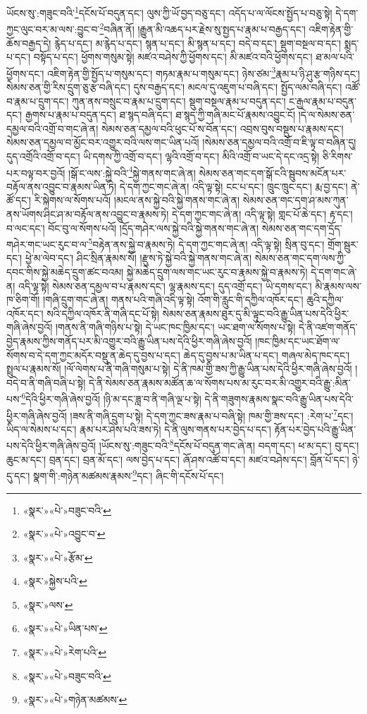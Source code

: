 ཡོངས་སུ་:གཟུང་བའི་\footnote{«སྣར་»«པེ་»བཟུང་བའི་}དངོས་པོ་བདུན་དང་། ལུས་ཀྱི་ཡོ་བྱད་བཅུ་དང་། འདོད་པ་ལ་ལོངས་སྤྱོད་པ་བཅུ་སྟེ། དེ་དག་ཀྱང་ལུང་བར་མ་ལས་:བྱུང་བ་\footnote{«སྣར་»«པེ་»འབྱུང་བ་}བཞིན་ནོ། །རྒྱུན་མི་འཆད་པར་རྗེས་སུ་སྤྱད་པ་རྣམ་པ་བརྒྱད་དང་། འཇིག་རྟེན་གྱི་ཆོས་བརྒྱད་དེ། རྙེད་པ་དང་། མ་རྙེད་པ་དང་། སྙན་པ་དང་། མི་སྙན་པ་དང་། བདེ་བ་དང་། སྡུག་བསྔལ་བ་དང་། སྨད་པ་དང་། བསྟོད་པ་དང་། ཕྱོགས་གསུམ་སྟེ། མཛའ་བཤེས་ཀྱི་ཕྱོགས་དང་། མི་མཛའ་བའི་ཕྱོགས་དང་། ཐ་མལ་པའི་ཕྱོགས་དང་། འཇིག་རྟེན་གྱི་སྤྱོད་པ་གསུམ་དང་། གཏམ་རྣམ་པ་གསུམ་དང་། ཉེས་ཙམ་\footnote{«སྣར་»«པེ་»རྩོམ་}རྣམ་པ་ཉི་ཤུ་རྩ་གཉིས་དང་། སེམས་ཅན་གྱི་རིས་དྲུག་ཅུ་རྩ་བཞི་དང་། དུས་བརྒྱད་དང་། མངལ་དུ་འཇུག་པ་བཞི་དང་། སྤྱོད་ལམ་བཞི་དང་། འཚོ་བ་རྣམ་པ་དྲུག་དང་། ཀུན་ནས་བསྲུང་བ་རྣམ་པ་དྲུག་དང་། སྡུག་བསྔལ་རྣམ་པ་བདུན་དང་། ང་རྒྱལ་རྣམ་པ་བདུན་དང་། རྒྱགས་པ་རྣམ་པ་བདུན་དང་། ཐ་སྙད་བཞི་དང་། ཐ་སྙད་ཀྱི་གཞི་མང་པོ་རྣམས་འབྱུང་ངོ། །དེ་ལ་སེམས་ཅན་དམྱལ་བའི་འགྲོ་བ་གང་ཞེ་ན། སེམས་ཅན་དམྱལ་བའི་ཕུང་པོ་ས་བོན་དང་། འབྲས་བུས་བསྡུས་པ་རྣམས་དང་། སེམས་ཅན་དམྱལ་བ་མྱོང་བར་འགྱུར་བའི་ལས་གང་ཡིན་པའོ། །སེམས་ཅན་དམྱལ་བའི་འགྲོ་བ་ཇི་ལྟ་བ་བཞིན་དུ། དུད་འགྲོའི་འགྲོ་བ་དང་། ཡི་དགས་ཀྱི་འགྲོ་བ་དང་། ལྷའི་འགྲོ་བ་དང་། མིའི་འགྲོ་བ་ཡང་དེ་དང་འདྲ་སྟེ། ཅི་རིགས་པར་བལྟ་བར་བྱའོ། །སྒོ་ང་ལས་:སྐྱེ་བའི་\footnote{«སྣར་»སྐྱེས་པའི་}སྐྱེ་གནས་གང་ཞེ་ན། སེམས་ཅན་གང་དག་སྒོ་ངའི་སྦུབས་མངོན་པར་བརྟོལ་ནས་འབྱུང་བ་རྣམས་ཡིན་ཏེ། དེ་དག་ཀྱང་གང་ཞེ་ན། འདི་ལྟ་སྟེ། ངང་པ་དང་། ཁྲུང་ཁྲུང་དང་། རྨ་བྱ་དང་། ནེ་ཚོ་དང་། རི་སྐེགས་ལ་སོགས་པའོ། །མངལ་ནས་སྐྱེ་བའི་སྐྱེ་གནས་གང་ཞེ་ན། སེམས་ཅན་གང་དག་ཤ་མས་ཀུན་ནས་ཡོགས་ཤིང་ཤ་མ་བརྟོལ་ནས་འབྱུང་བ་རྣམས་ཏེ། དེ་དག་ཀྱང་གང་ཞེ་ན། འདི་ལྟ་སྟེ། གླང་པོ་ཆེ་དང་། རྟ་དང་། བ་ལང་དང་། བོང་བུ་ལ་སོགས་པའོ། །དྲོད་གཤེར་ལས་སྐྱེ་བའི་སྐྱེ་གནས་གང་ཞེ་ན། སེམས་ཅན་གང་དག་དྲོད་གཤེར་གང་ཡང་རུང་བ་ལ་\footnote{«སྣར་»ལས་}བརྟེན་ནས་སྐྱེ་བ་རྣམས་ཏེ། དེ་དག་ཀྱང་གང་ཞེ་ན། འདི་ལྟ་སྟེ། སྲིན་བུ་དང་། གྲོག་སྦུར་དང་། ཕྱེ་མ་ལེབ་དང་། ཤིང་སྲིན་རྣམས་སོ། །རྫུས་ཏེ་སྐྱེ་བའི་སྐྱེ་གནས་གང་ཞེ་ན། སེམས་ཅན་གང་དག་ལས་ཀྱི་དབང་གིས་སྐྱེ་མཆེད་དྲུག་ཚང་བའམ། སྐྱེ་མཆེད་དྲུག་ལས་གང་ཡང་རུང་བ་རྣམས་སྐྱེ་བ་རྣམས་ཏེ། དེ་དག་གང་ཞེ་ན། འདི་ལྟ་སྟེ། སེམས་ཅན་དམྱལ་བ་པ་རྣམས་དང་། ལྷ་རྣམས་དང་། དུད་འགྲོ་དང་། ཡི་དགས་དང་། མི་རྣམས་ལས་ཁ་ཅིག་གོ། །གཞི་དྲུག་གང་ཞེ་ན། གནས་པའི་གཞི་འདི་ལྟ་སྟེ། འོག་གི་རླུང་གི་དཀྱིལ་འཁོར་དང་། ཆུའི་དཀྱིལ་འཁོར་དང་། སའི་དཀྱིལ་འཁོར་ནི་གཞི་དང་པོ་སྟེ། སེམས་ཅན་རྣམས་ཐུར་དུ་མི་ལྟུང་བའི་རྒྱུ་ཡིན་པས་དེའི་ཕྱིར་གཞི་ཞེས་བྱའོ། །གནས་ནི་གཞི་གཉིས་པ་སྟེ། དེ་ཡང་ཁང་ཁྱིམ་དང་། ཡང་ཐག་ལ་སོགས་པ་སྟེ། དེ་ནི་འཛག་གནོད་བྱེད་རྣམས་ཀྱིས་གནོད་པར་མི་འགྱུར་བའི་རྒྱུ་ཡིན་པས་དེའི་ཕྱིར་གཞི་ཞེས་བྱའོ། །ཁང་ཁྱིམ་དང་ཡང་ཐོག་ལ་སོགས་བ་དེ་དག་ཀྱང་མདོར་བསྡུ་ན་ཆེད་དུ་བྱས་པ་དང་། ཆེད་དུ་བྱས་པ་མ་ཡིན་པ་དང་། གཞལ་མེད་ཁང་དང་། སྤྲུལ་པ་རྣམས་སོ། །ལོ་ལེགས་པ་ནི་གཞི་གསུམ་པ་སྟེ། དེ་ནི་ཁམ་གྱི་ཟས་ཀྱི་རྒྱུ་ཡིན་པས་དེའི་ཕྱིར་གཞི་ཞེས་བྱའོ། །བདེ་བ་ནི་གཞི་བཞི་པ་སྟེ། དེ་ནི་སེམས་ཅན་རྣམས་མཚོན་ཆ་ལ་སོགས་པས་མ་རུང་བར་མི་འགྱུར་བའི་རྒྱུ་:མིན་པས་\footnote{«སྣར་»«པེ་»ཡིན་པས་}དེའི་ཕྱིར་གཞི་ཞེས་བྱའོ། །ཉི་མ་དང་ཟླ་བ་ནི་གཞི་ལྔ་པ་སྟེ། དེ་ནི་གཟུགས་རྣམས་སྣང་བའི་རྒྱུ་ཡིན་པས་དེའི་ཕྱིར་གཞི་ཞེས་བྱའོ། །ཟས་ནི་གཞི་དྲུག་པ་སྟེ། དེ་དག་ཀྱང་ཟས་རྣམ་པ་བཞི་སྟེ། ཁམ་གྱི་ཟས་དང་། :རེག་པ་\footnote{«སྣར་»«པེ་»རེག་པའི་}དང་། ཡིད་ལ་སེམས་པ་དང་། རྣམ་པར་ཤེས་པའི་ཟས་ཏེ། དེ་ནི་ལུས་གནས་པར་བྱེད་པ་དང་། རྟོན་པར་བྱེད་པའི་རྒྱུ་ཡིན་པས་དེའི་ཕྱིར་གཞི་ཞེས་བྱའོ། །ཡོངས་སུ་:གཟུང་བའི་\footnote{«སྣར་»«པེ་»བཟུང་བའི་}དངོས་པོ་བདུན་གང་ཞེ་ན། བདག་དང་། ཕ་མ་དང་། བུ་དང་། ཆུང་མ་དང་། བྲན་དང་། བྲན་མོ་དང་། ལས་བྱེད་པ་དང་། ཞོ་ཤས་འཚོ་བ་དང་། མཛའ་བཤེས་དང་། བློན་པོ་དང་། ཉེ་དུ་དང་། སྣག་གི་:གཉེན་མཚམས་རྣམས་\footnote{«སྣར་»«པེ་»གཉེན་མཚམས་}དང་། ཞིང་གི་དངོས་པོ་དང་། 